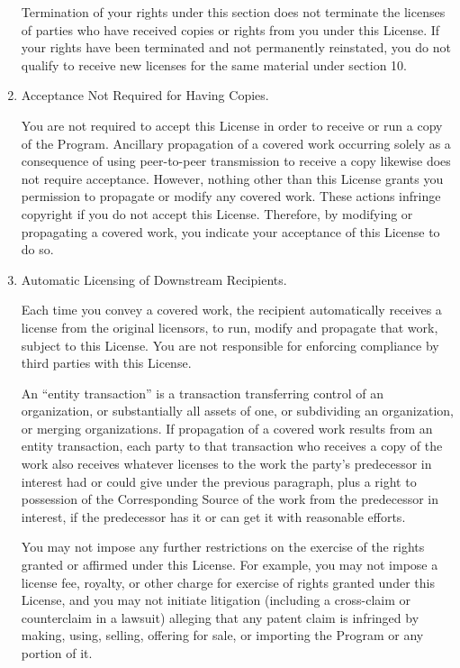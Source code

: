 \documentclass[11pt]{article}
\begin{document}
\begin{enumerate}
          Termination of your rights under this section does not terminate the
          licenses of parties who have received copies or rights from you under
          this License.  If your rights have been terminated and not permanently
          reinstated, you do not qualify to receive new licenses for the same
          material under section 10.

    \item Acceptance Not Required for Having Copies.

          You are not required to accept this License in order to receive or
          run a copy of the Program.  Ancillary propagation of a covered work
          occurring solely as a consequence of using peer-to-peer transmission
          to receive a copy likewise does not require acceptance.  However,
          nothing other than this License grants you permission to propagate or
          modify any covered work.  These actions infringe copyright if you do
          not accept this License.  Therefore, by modifying or propagating a
          covered work, you indicate your acceptance of this License to do so.

    \item Automatic Licensing of Downstream Recipients.

          Each time you convey a covered work, the recipient automatically
          receives a license from the original licensors, to run, modify and
          propagate that work, subject to this License.  You are not responsible
          for enforcing compliance by third parties with this License.

          An ``entity transaction'' is a transaction transferring control of an
          organization, or substantially all assets of one, or subdividing an
          organization, or merging organizations.  If propagation of a covered
          work results from an entity transaction, each party to that
          transaction who receives a copy of the work also receives whatever
          licenses to the work the party's predecessor in interest had or could
          give under the previous paragraph, plus a right to possession of the
          Corresponding Source of the work from the predecessor in interest, if
          the predecessor has it or can get it with reasonable efforts.

          You may not impose any further restrictions on the exercise of the
          rights granted or affirmed under this License.  For example, you may
          not impose a license fee, royalty, or other charge for exercise of
          rights granted under this License, and you may not initiate litigation
          (including a cross-claim or counterclaim in a lawsuit) alleging that
          any patent claim is infringed by making, using, selling, offering for
          sale, or importing the Program or any portion of it.


\end{enumerate}
\end{document}
